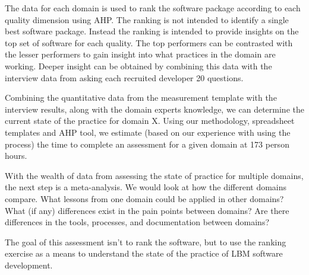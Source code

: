 \documentclass[runningheads]{llncs}
\begin{document}
The data for each domain is used to rank the software package according to each
quality dimension using AHP.  The ranking is not intended to identify a single
best software package.  Instead the ranking is intended to provide insights on
the top set of software for each quality.  The top performers can be contrasted
with the lesser performers to gain insight into what practices in the domain are
working.  Deeper insight can be obtained by combining this data with the
interview data from asking each recruited developer 20 questions.

Combining the quantitative data from the measurement template with the interview
results, along with the domain experts knowledge, we can determine the current
state of the practice for domain X.  Using our methodology, spreadsheet
templates and AHP tool, we estimate (based on our experience with using the
process) the time to complete an assessment for a given domain at 173 person
hours.

With the wealth of data from assessing the state of practice for multiple
domains, the next step is a meta-analysis.  We would look at how the different
domains compare. What lessons from one domain could be applied in other domains?
What (if any) differences exist in the pain points between domains?  Are there
differences in the tools, processes, and documentation between domains?

The goal of this assessment isn't to rank the software, but to use the ranking
exercise as a means to understand the state of the practice of LBM software
development.

%
%
%


%




\end{document}
